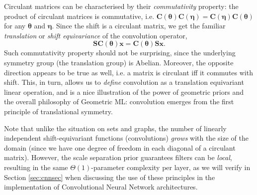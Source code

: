 



Circulant matrices can be characterised by their {\em commutativity} property: the product of circulant matrices is commutative, i.e. 
$\mathbf{C}(\boldsymbol{\theta}) \mathbf{C}(\boldsymbol{\eta}) = \mathbf{C}(\boldsymbol{\eta}) \mathbf{C}(\boldsymbol{\theta})$ for any $\boldsymbol{\theta}$ and $\boldsymbol{\eta}$.
%
Since the shift is a circulant matrix, we get the familiar {\em translation} or {\em shift equivariance} of the convolution operator, 
$$
\mathbf{S} \mathbf{C}(\boldsymbol{\theta}) \mathbf{x} = 
\mathbf{C}(\boldsymbol{\theta}) \mathbf{S} \mathbf{x}.
$$
%
Such commutativity property should not be surprising, since the underlying symmetry group (the translation group) is Abelian. 
Moreover, the opposite direction appears to be true as well, i.e. 
a matrix is circulant iff it commutes with shift.
%
This, in turn, allows us to {\em define} convolution as a translation equivariant linear operation, and is a nice illustration of the power of geometric priors and the overall philosophy of Geometric ML: convolution emerges from the first principle of translational symmetry. 


Note that unlike the situation on sets and graphs, the number of linearly independent shift-equivariant functions (convolutions) \emph{grows} with the size of the domain (since we have one degree of freedom in each diagonal of a circulant matrix). However, the scale separation prior guarantees filters can be {\em local}, resulting in the same $\Theta(1)$-parameter complexity per layer, as we will verify in Section \ref{sec:cnnsec} when discussing the use of these principles in the implementation of Convolutional Neural Network architectures.




